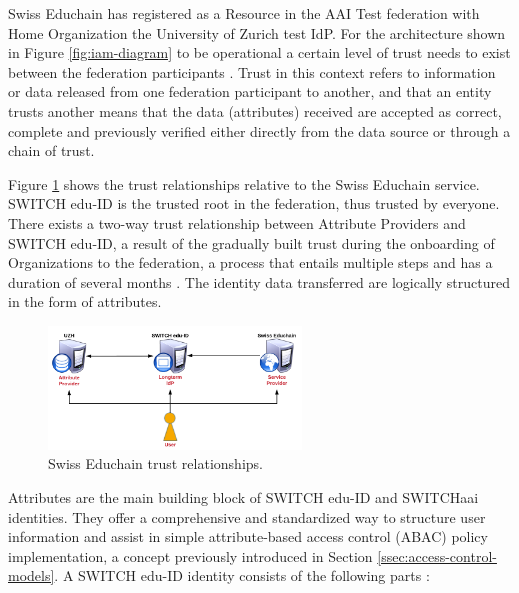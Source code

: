 Swiss Educhain has registered as a Resource in the AAI Test federation with Home Organization the University of Zurich test IdP. For the architecture shown in Figure \ref{fig:iam-diagram} to be operational a certain level of trust needs to exist between the federation participants \cite{aai-federation}. Trust in this context refers to information or data  released from one federation participant to another, and that an entity trusts another means that the data (attributes) received are accepted as correct, complete and previously verified either directly from the data source or through a chain of trust. 



Figure \ref{fig:iam-trust-diagram} shows the trust relationships relative to the Swiss Educhain service. SWITCH edu-ID is the trusted root in the federation, thus trusted by everyone. There exists a two-way trust relationship between Attribute Providers and SWITCH edu-ID, a result of the gradually built trust during the onboarding of Organizations to the federation, a process that entails multiple steps and has a duration of several months \cite{eduid-adoption}. The identity data transferred are logically structured in the form of attributes. 

\begin{figure}[ht!]
	\centering
	\captionsetup{width=.75\linewidth}
	\includegraphics[width=0.6\textwidth]{figs/ch4/iam-trust-diagram}
	\caption{Swiss Educhain trust relationships.}
	\label{fig:iam-trust-diagram}
\end{figure}

Attributes are the main building block of SWITCH edu-ID and SWITCHaai identities. They offer a comprehensive and standardized way to structure user information and assist in simple attribute-based access control (ABAC) policy implementation, a concept previously introduced in Section \ref{ssec:access-control-models}. A SWITCH edu-ID identity consists of the following parts \cite{attribute-model}:

